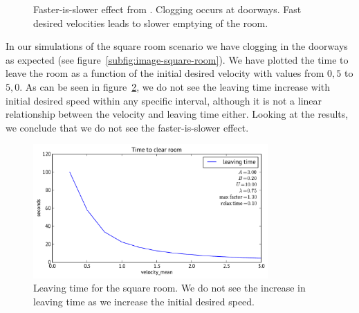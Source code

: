 \begin{figure}[ht]
    \centering
    \caption[Faster-is-slower effect from \cite{helbing00}]{Faster-is-slower 
    effect from \cite{helbing00}.  Clogging 
    occurs at doorways.  Fast desired 
    velocities leads to slower emptying of the room.}
    \label{fig:LtNFasterIsSlower}
\end{figure}

In our simulations of the square room scenario we have clogging in the 
doorways as expected (see figure~\ref{subfig:image-square-room}). We have 
plotted the time to leave the room as a function of the initial desired 
velocity with values from $0,5$ to $5,0$. As can be seen in 
figure~\ref{fig:square-room-leaving}, we do not see the leaving 
time increase with initial desired speed within any specific interval, although 
it is not a linear relationship between the velocity and 
leaving time either. Looking at the results, we conclude that we  do not see 
the faster-is-slower effect.

\begin{figure}[ht]
    \centering
    \includegraphics[width=0.8\textwidth]{Figures/timetoclearroom.pdf}
    \caption[Leaving time for the square room]{Leaving time for the square 
    room. We do not see the increase in leaving time as we increase the initial 
    desired speed.}
    \label{fig:square-room-leaving}
\end{figure}


